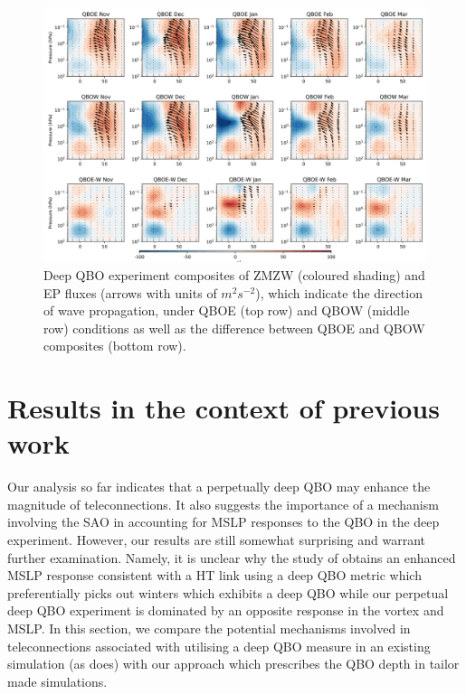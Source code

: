 \begin{figure}[h!]
\begin{center}
\noindent\includegraphics[width = \linewidth]{Figures/Figures-deepQBO/EP_flux_composites_by_month_QBO_phases_d_higher_MarQBO_vs_Mar_30hPa_5thresh.png}
\caption[]{Deep QBO experiment composites of ZMZW (coloured shading) and EP fluxes (arrows with units of $m^2s^{-2}$), which indicate the direction of wave propagation, under QBOE (top row) and QBOW (middle row) conditions as well as the difference between QBOE and QBOW composites (bottom row).}
\label{fig:EP_deep}
\end{center}
\end{figure}
\newpage

\section{Results in the context of previous work}
Our analysis so far indicates that a perpetually deep QBO may enhance the magnitude of teleconnections. It also suggests the importance of a mechanism involving the SAO in accounting for MSLP responses to the QBO in the deep experiment. However, our results are still somewhat surprising and warrant further examination. Namely, it is unclear why the study of \cite{andrewsObserved2019d} obtains an enhanced MSLP response consistent with a HT link using a deep QBO metric which preferentially picks out winters which exhibits a deep QBO while our perpetual deep QBO experiment is dominated by an opposite response in the vortex and MSLP. In this section, we compare the potential mechanisms involved in teleconnections associated with utilising a deep QBO measure in an existing simulation (as \cite{andrewsObserved2019d} does) with our approach which prescribes the QBO depth in tailor made simulations. 

